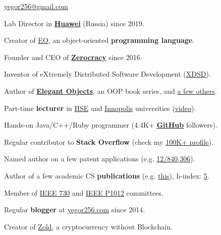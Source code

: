 \documentclass{yb}
\begin{document}
    \sffamily

    \ybPrintPhoto{}

    {\scshape\bfseries\Large {}}\newline
    \href{mailto:yegor256@gmail.com}{yegor256@gmail.com}

    \vspace{1em}

    Lab Director in \textbf{\href{https://www.huawei.com}{Huawei}} (Russia) since 2019.

    Creator of \href{https://www.eolang.org}{EO}, an object-oriented \textbf{programming language}.

    Founder and CEO of \textbf{\href{https://www.zerocracy.com}{Zerocracy}} since 2016.

    Inventor of eXtremely Distributed Software Development (\href{https://www.xdsd.org}{XDSD}).

    Author of \textbf{\href{https://www.yegor256.com/elegant-objects.html}{Elegant Objects}},
    an OOP book series, and \href{https://www.yegor256.com/books.html}{a few others}.

    Part-time \textbf{lecturer} in \href{https://www.hse.ru/en/}{HSE}
    and \href{https://innopolis.university/en/}{Innopolis} universities
    (\href{https://www.youtube.com/playlist?list=PLaIsQH4uc08y14wCJMeffS2yErN4QpB8m}{video}).

    Hands-on Java/C++/Ruby programmer
    (4.4K+ \textbf{\href{https://github.com/yegor256}{GitHub}} followers).

    Regular contributor to \textbf{Stack Overflow}
    (check my \href{https://stackexchange.com/users/63162/yegor256}{100K+ profile}).

    Named author on a few patent applications
    (e.g. \href{https://www.google.com/patents/US20120023476}{12/840,306}).

    Author of a few academic CS \textbf{publications}
    (e.g. \href{https://link.springer.com/chapter/10.1007/978-3-642-02152-7_6}{this}),
    h-index: \href{https://scholar.google.com/citations?user=cYmXh60AAAAJ}{5}.

    Member of \href{http://standards.ieee.org/develop/wg/730.html}{IEEE 730} and
    \href{https://standards.ieee.org/ieee/1012/7324/}{IEEE P1012} committees.

    Regular \textbf{blogger} at \href{https://www.yegor256.com/}{yegor256.com} since 2014.

    Creator of \href{https://www.zold.io}{Zold}, a cryptocurrency without Blockchain.
\end{document}
